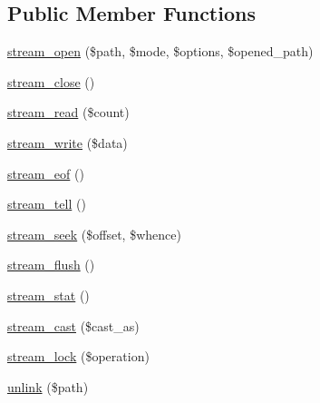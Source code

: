 \subsection*{Public Member Functions}
\begin{DoxyCompactItemize}
\item 
\mbox{\hyperlink{classorg_1_1bovigo_1_1vfs_1_1vfs_stream_wrapper_recording_proxy_af9ec49fcc8889aefee3b186443a895ab}{stream\+\_\+open}} (\$path, \$mode, \$options, \$opened\+\_\+path)
\item 
\mbox{\hyperlink{classorg_1_1bovigo_1_1vfs_1_1vfs_stream_wrapper_recording_proxy_af4c22f18f65f3a87da0abd141752a3f4}{stream\+\_\+close}} ()
\item 
\mbox{\hyperlink{classorg_1_1bovigo_1_1vfs_1_1vfs_stream_wrapper_recording_proxy_acf4adec38e34adc3b8cdec2f6ddaf1df}{stream\+\_\+read}} (\$count)
\item 
\mbox{\hyperlink{classorg_1_1bovigo_1_1vfs_1_1vfs_stream_wrapper_recording_proxy_a0f84598d2e48826e33d9c7de5364419a}{stream\+\_\+write}} (\$data)
\item 
\mbox{\hyperlink{classorg_1_1bovigo_1_1vfs_1_1vfs_stream_wrapper_recording_proxy_a3e9ce71f7c8ab0db36dfd38ea2039476}{stream\+\_\+eof}} ()
\item 
\mbox{\hyperlink{classorg_1_1bovigo_1_1vfs_1_1vfs_stream_wrapper_recording_proxy_aa3320416e4520b888b7a9b0ce6508cd6}{stream\+\_\+tell}} ()
\item 
\mbox{\hyperlink{classorg_1_1bovigo_1_1vfs_1_1vfs_stream_wrapper_recording_proxy_a11b8cbb2e2211df9c677df917afe092f}{stream\+\_\+seek}} (\$offset, \$whence)
\item 
\mbox{\hyperlink{classorg_1_1bovigo_1_1vfs_1_1vfs_stream_wrapper_recording_proxy_a8bc9b070955b413c37b960e4bf0a73d2}{stream\+\_\+flush}} ()
\item 
\mbox{\hyperlink{classorg_1_1bovigo_1_1vfs_1_1vfs_stream_wrapper_recording_proxy_ad5c2e5aede8f0bd6b523de4be61f169a}{stream\+\_\+stat}} ()
\item 
\mbox{\hyperlink{classorg_1_1bovigo_1_1vfs_1_1vfs_stream_wrapper_recording_proxy_afd8c7ec563b853761ea7d3470d0bee73}{stream\+\_\+cast}} (\$cast\+\_\+as)
\item 
\mbox{\hyperlink{classorg_1_1bovigo_1_1vfs_1_1vfs_stream_wrapper_recording_proxy_a9b45fe8e0c0ce5f58ecb0345851e0b25}{stream\+\_\+lock}} (\$operation)
\item 
\mbox{\hyperlink{classorg_1_1bovigo_1_1vfs_1_1vfs_stream_wrapper_recording_proxy_ad6244fc254de2b00ab567e4e0b82a4b3}{unlink}} (\$path)
\item 

\end{DoxyCompactItemize}
